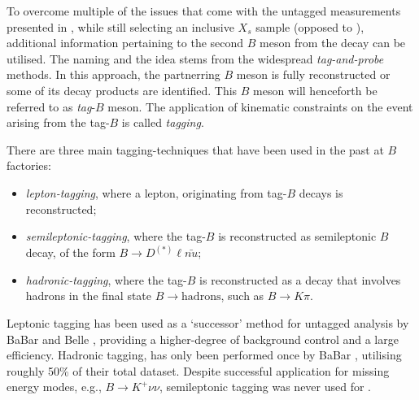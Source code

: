 To overcome multiple of the issues that come with the untagged measurements presented in , while still selecting an inclusive $X_s$ sample (opposed to ), 
additional information pertaining to the second $B$ meson from the \FourS decay can be utilised.
The naming and the idea stems from the widespread \textit{tag-and-probe} methods.
In this approach, the partnerring $B$ meson is fully reconstructed or some of its decay products are identified.
This $B$ meson will henceforth be referred to as \textit{tag}-$B$ meson.
The application of kinematic constraints on the event arising from the tag-$B$ is called \textit{tagging}.



There are three main tagging-techniques that have been used in the past at $B$ factories:
\begin{itemize}
    \item \textit{lepton-tagging}, where a lepton, originating from tag-$B$ decays is reconstructed;
    \item \textit{semileptonic-tagging}, where the tag-$B$ is reconstructed as semileptonic $B$ decay, of the form $B\to D^{(*)}\ell\bar{nu}$;
    \item \textit{hadronic-tagging}, where the tag-$B$ is reconstructed as a decay that involves hadrons in the final state $B\to\mathrm{hadrons}$, such as $B\to K\pi$.
\end{itemize}
Leptonic tagging has been used as a `successor' method for \BtoXsgamma untagged analysis by BaBar and Belle \cite{Belle:2009nth,BaBar:2012fqh,Belle:2016ufb}, providing a higher-degree of background control and a large efficiency.
Hadronic tagging, has only been performed once by BaBar \cite{BaBar:2007yhb}, utilising roughly 50\% of their total dataset.
Despite successful application for missing energy modes, e.g., $B\rightarrow K^+\nu\nu$, semileptonic tagging was never used for \BtoXsgamma.






